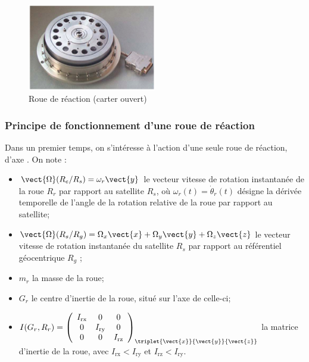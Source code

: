 \begin{figure}[!htb]
\begin{center}
\includegraphics[width=0.5\textwidth]{images/image6.jpg}
\end{center}
\caption{Roue de réaction (carter ouvert) \label{fig6}}
\end{figure}
\fi

\subsubsection{Principe de fonctionnement d'une roue de réaction}

\ifprof
\else

Dans un premier temps, on s'intéresse à l'action d'une seule roue de
réaction, d'axe . On note :

\begin{itemize}
\item $\vect{\Omega}(R_e/R_s)=\omega_r\vect{y}$ le vecteur vitesse de rotation instantanée de la roue $R_r$ par rapport au
  satellite $R_s$, où $\omega_r(t)=\dot{\theta}_r(t)$ désigne la dérivée temporelle de l'angle de la rotation
  relative de la roue par rapport au satellite;
\item $\vect{\Omega}(R_s/R_g)=\Omega_x\vect{x}+\Omega_y\vect{y}+\Omega_z\vect{z}$
  le vecteur vitesse de rotation instantanée du satellite $R_s$ par rapport au
  référentiel géocentrique $R_g$ ;
\item $m_r$ la masse de la roue;
  
\item $G_r$ le centre d'inertie de la roue, situé sur l'axe de celle-ci;
  
\item $
I(G_r,R_r)=
\left(
\begin{array}{ccc}
I_{\text{rx}} & 0 & 0 \\ 
0 & I_{\text{ry}} & 0 \\ 
0 & 0 & I_{\text{rz}}
\end{array}
\right)_{\triplet{\vect{x}}{\vect{y}}{\vect{z}}} 
$
 la matrice d'inertie de la roue, avec $I_{\text{rx}}<I_{\text{ry}}$ et $I_{\text{rz}}<I_{\text{ry}}$.
  
\end{itemize}

